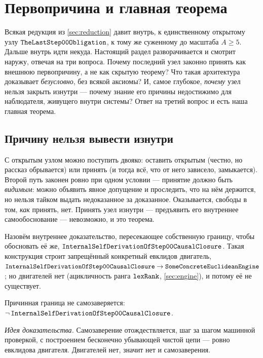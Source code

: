 \section{Первопричина и главная теорема}\label{sec:firstcause}

Всякая редукция из \cref{sec:reduction} давит внутрь, к единственному открытому узлу
$\texttt{TheLastStep00Obligation}$, к тому же суженному до масштаба $A \ge 5$. Дальше внутрь идти
некуда. Настоящий раздел разворачивается и смотрит наружу, отвечая на три вопроса. Почему последний
узел законно принять как внешнюю первопричину, а не как скрытую теорему? Что такая архитектура
доказывает \emph{безусловно}, без всякой аксиомы? И, самое глубокое, \emph{почему} узел нельзя
закрыть изнутри --- почему знание его причины недостижимо для наблюдателя, живущего внутри системы?
Ответ на третий вопрос и есть наша главная теорема.

\subsection{Причину нельзя вывести изнутри}

С открытым узлом можно поступить двояко: оставить открытым (честно, но рассказ обрывается) или
принять (и тогда всё, что от него зависело, замыкается). Второй путь законен ровно при одном условии
--- принятие должно быть \emph{видимым}: можно объявить явное допущение и проследить, что на нём
держится, но нельзя тайком выдать недоказанное за доказанное. Оказывается, свободы в том, \emph{как}
принять, нет. Принять узел изнутри --- предъявить его внутреннее самообоснование --- невозможно, и
это теорема.

Назовём внутреннее доказательство, пересекающее собственную границу, чтобы обосновать её же,
$\texttt{InternalSelfDerivationOfStep00CausalClosure}$. Такая конструкция строит запрещённый конкретный
евклидов двигатель, $\texttt{InternalSelfDerivationOfStep00CausalClosure} \to
\texttt{SomeConcreteEuclideanEngine}$; но двигателей нет (ацикличность ранга $\texttt{lexRank}$,
\cref{sec:engine}), и потому её не существует.

\begin{theorem}\label{thm:no_internalSelfDerivation_step00CausalClosure}
\green{} Причинная граница не самозаверяется:
$\lnot\,\texttt{InternalSelfDerivationOfStep00CausalClosure}$.
\end{theorem}

\emph{Идея доказательства.} Самозаверение отождествляется, шаг за шагом машинной проверкой, с
построением бесконечно убывающей чистой цепи --- ровно евклидова двигателя. Двигателей нет, значит нет
и самозаверения.

